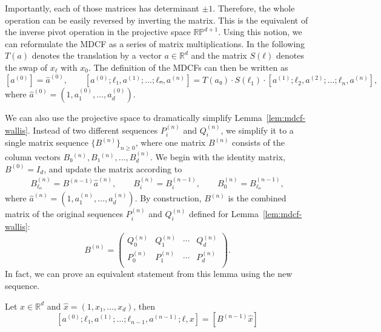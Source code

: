 Importantly, each of those matrices has
determinant $±1$.
Therefore, the whole operation can be easily reversed by inverting the matrix.
This is the equivalent of the inverse pivot operation in
the projective space $\mathbb{RP}^{d+1}$.
Using this notion, we can reformulate the MDCF as a series of matrix multiplications.
In the following $T(a)$ denotes the translation by a vector $a ∈ ℝ^d$
and the matrix $S(ℓ)$ denotes the swap of $x_\ell$ with $x_0$.
The definition of the MDCFs can then be written as
\[
  [a^{(0)}] = \hat a^{(0)}, \qquad
  [a^{(0)}; ℓ₁, a^{(1)}; …; ℓₙ, a^{(n)}] = T(a₀) · S(ℓ_1) · [a^{(1)}; ℓ_2, a^{(2)}; …; ℓ_n, a^{(n)}],
\]
where $\hat a^{(0)} = (1, a_1^{(0)}, …, a_d^{(0)})$.

We can also use the projective space to dramatically simplify Lemma~\ref{lem:mdcf-wallis}.
Instead of two different sequences $P_i^{(n)}$ and $Q_i^{(n)}$, we simplify it to a single matrix sequence $\{B^{(n)}\}_{n ≥ 0}$,
where one matrix $B^{(n)}$ consists of the column vectors $B₀^{(n)}, B₁^{(n)}, …, B_d^{(n)}$.
We begin with the identity matrix, $B^{(0)} = I_d$, and update the matrix according to
\begin{align*}
  B_{ℓₙ}^{(n)} = B^{(n-1)} \hat a^{(n)},
  \qquad B_i^{(n)} = B_i^{(n-1)},
  \qquad B_0^{(n)} = B_{ℓₙ}^{(n-1)},
\end{align*}
where $\hat a^{(n)} = (1, a_1^{(n)}, …, a_d^{(n)})$.
By construction, $B^{(n)}$ is the combined matrix of the original sequences
$P_i^{(n)}$ and $Q_i^{(n)}$ defined for Lemma~\vref{lem:mdcf-wallis}:
\[
  B^{(n)} = \begin{pmatrix}
    Q_0^{(n)} & Q_1^{(n)} & ⋯ & Q_d^{(n)} \\
    P_0^{(n)} & P_1^{(n)} & ⋯ & P_d^{(n)} \\
  \end{pmatrix}.
\]
In fact, we can prove an equivalent statement from this lemma using the new sequence.

\begin{lemma}
  \label{lem:mdcf-wallis'}
  Let $x ∈ ℝ^d$ and $\hat x = (1, x₁, …, x_d)$, then
  \[
    [a^{(0)}; ℓ₁, a^{(1)}; …; ℓ_{n-1}, a^{(n-1)}; ℓ, x] = [B^{(n-1)} \hat x]
  \]
\end{lemma}

